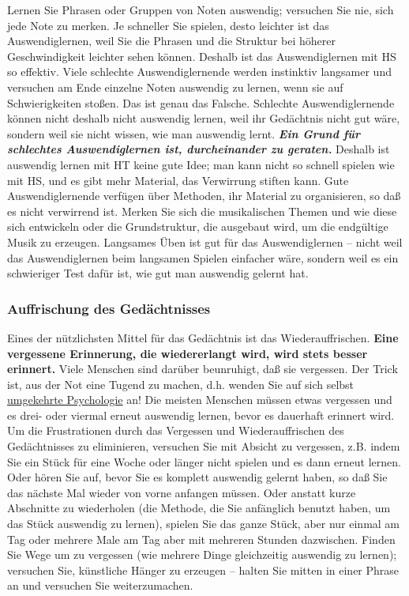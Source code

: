 Lernen Sie Phrasen oder Gruppen von Noten auswendig; versuchen Sie nie, sich jede Note zu merken.
Je schneller Sie spielen, desto leichter ist das Auswendiglernen, weil Sie die Phrasen und die Struktur bei höherer Geschwindigkeit leichter sehen können.
Deshalb ist das Auswendiglernen mit HS so effektiv.
Viele schlechte Auswendiglernende werden instinktiv langsamer und versuchen am Ende einzelne Noten auswendig zu lernen, wenn sie auf Schwierigkeiten stoßen.
Das ist genau das Falsche.
Schlechte Auswendiglernende können nicht deshalb nicht auswendig lernen, weil ihr Gedächtnis nicht gut wäre, sondern weil sie nicht wissen, wie man auswendig lernt.
\textbf{\textit{Ein Grund für schlechtes Auswendiglernen ist, durcheinander zu geraten.}}
Deshalb ist auswendig lernen mit HT keine gute Idee; man kann nicht so schnell spielen wie mit HS, und es gibt mehr Material, das Verwirrung stiften kann.
Gute Auswendiglernende verfügen über Methoden, ihr Material zu organisieren, so daß es nicht verwirrend ist.
Merken Sie sich die musikalischen Themen und wie diese sich entwickeln oder die Grundstruktur, die ausgebaut wird, um die endgültige Musik zu erzeugen.
Langsames Üben ist gut für das Auswendiglernen -- nicht weil das Auswendiglernen beim langsamen Spielen einfacher wäre, sondern weil es ein schwieriger Test dafür ist, wie gut man auswendig gelernt hat.


\subsubsection{Auffrischung des Gedächtnisses}
\label{c1iii6f}

Eines der nützlichsten Mittel für das Gedächtnis ist das Wiederauffrischen.
\textbf{Eine vergessene Erinnerung, die wiedererlangt wird, wird stets besser erinnert.}
Viele Menschen sind darüber beunruhigt, daß sie vergessen.
Der Trick ist, aus der Not eine Tugend zu machen, d.h. wenden Sie auf sich selbst \hyperref[reversepsychology]{umgekehrte Psychologie} an!
Die meisten Menschen müssen etwas vergessen und es drei- oder viermal erneut auswendig lernen, bevor es dauerhaft erinnert wird.
Um die Frustrationen durch das Vergessen und Wiederauffrischen des Gedächtnisses zu eliminieren, versuchen Sie mit Absicht zu vergessen, z.B. indem Sie ein Stück für eine Woche oder länger nicht spielen und es dann erneut lernen.
Oder hören Sie auf, bevor Sie es komplett auswendig gelernt haben, so daß Sie das nächste Mal wieder von vorne anfangen müssen.
Oder anstatt kurze Abschnitte zu wiederholen (die Methode, die Sie anfänglich benutzt haben, um das Stück auswendig zu lernen), spielen Sie das ganze Stück, aber nur einmal am Tag oder mehrere Male am Tag aber mit mehreren Stunden dazwischen.
Finden Sie Wege um zu vergessen (wie mehrere Dinge gleichzeitig auswendig zu lernen); versuchen Sie, künstliche Hänger zu erzeugen -- halten Sie mitten in einer Phrase an und versuchen Sie weiterzumachen.

